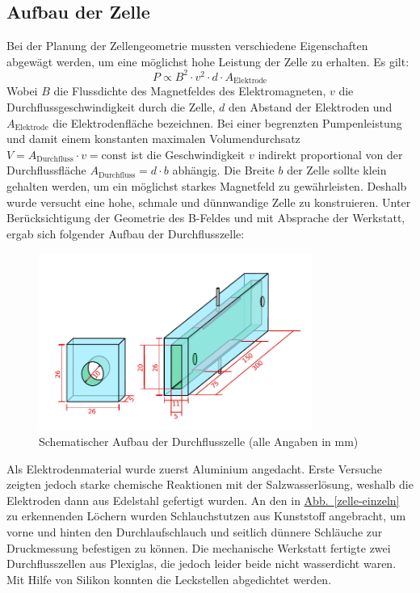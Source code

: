 \documentclass[11pt]{scrartcl}
\newcommand{\abb}[1]{\hyperref[#1]{Abb.~\ref{#1}}}
\begin{document}
\subsection{Aufbau der Zelle}			%
Bei der Planung der Zellengeometrie mussten verschiedene Eigenschaften abgewägt werden, um eine möglichst hohe Leistung der Zelle zu erhalten.
Es gilt:
\begin{equation}
P \propto B^2 \cdot v^2 \cdot d \cdot A_{\text{Elektrode}}
\end{equation}
Wobei $B$ die Flussdichte des Magnetfeldes des Elektromagneten, $v$ die Durchflussgeschwindigkeit durch die Zelle, $d$ den Abstand der Elektroden und $A_{\text{Elektrode}}$ die Elektrodenfläche bezeichnen. 
Bei einer begrenzten Pumpenleistung und damit einem konstanten maximalen Volumendurchsatz $V=A_{\text{Durchfluss}} \cdot v=\text{const}$ ist die Geschwindigkeit $v$ indirekt proportional von der Durchflussfläche $A_{\text{Durchfluss}} = d \cdot b$ abhängig.
Die Breite $b$ der Zelle sollte klein gehalten werden, um ein möglichst starkes Magnetfeld zu gewährleisten. Deshalb wurde versucht eine hohe, schmale und dünnwandige Zelle zu konstruieren.
Unter Berücksichtigung der Geometrie des B-Feldes und mit Absprache der Werkstatt, ergab sich folgender Aufbau der Durchflusszelle:

\begin{figure}[ht]
\begin{center}
\includegraphics[width=0.8\textwidth]{images/zelle-schema.pdf}
\end{center}
\vspace{-1.5\baselineskip}
\caption{Schematischer Aufbau der Durchflusszelle (alle Angaben in mm)}
\label{zelle-schema}
\end{figure}

Als Elektrodenmaterial wurde zuerst Aluminium angedacht. Erste Versuche zeigten jedoch starke chemische Reaktionen mit der Salzwasserlösung, weshalb die Elektroden dann aus Edelstahl gefertigt wurden. 
An den in \abb{zelle-einzeln} zu erkennenden Löchern wurden Schlauchstutzen aus Kunststoff angebracht, um vorne und hinten den Durchlaufschlauch und seitlich dünnere Schläuche zur Druckmessung befestigen zu können.
Die mechanische Werkstatt fertigte zwei Durchflusszellen aus Plexiglas, die jedoch leider beide nicht wasserdicht waren. Mit Hilfe von Silikon konnten die Leckstellen abgedichtet werden.
\end{document}
